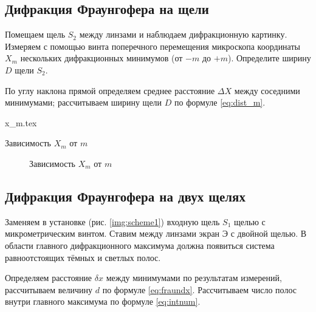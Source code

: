 \documentclass[a5paper,10pt, twoside]{article} %
\begin{document}
\subsection{Дифракция Фраунгофера на щели}

Помещаем щель $S_2$ между линзами и наблюдаем дифракционную картинку. Измеряем с помощью винта 
поперечного перемещения микроскопа координаты $X_m$ нескольких дифракционных минимумов 
(от $-m$ до $+m$). Определите ширину $D$ щели $S_2$.

По углу наклона прямой определяем среднее расстояние $\Delta X$ между соседними минимумами;
рассчитываем ширину щели $D$ по формуле \eqref{eq:dist_m}.

\begin{table}[h]
	\begin{center}
		{x_m.tex}
	\end{center}
	\caption{Зависимость $X_m$ от $m$}
\end{table}

\begin{figure}[h]
	\caption{Зависимость $X_m$ от $m$} 
\end{figure}

\subsection{Дифракция Фраунгофера на двух щелях}

Заменяем в установке (рис. \ref{img:scheme1}) входную щель $S_1$ щелью с микрометрическим винтом.
Ставим между линзами экран Э с двойной щелью. В области главного дифракционного максимума должна 
появиться система равноотстоящих тёмных и светлых полос.

Определяем расстояние $\delta x$ между минимумами по результатам измерений, рассчитываем величину 
$d$ по формуле \eqref{eq:fraundx}. Рассчитываем число полос внутри главного максимума по формуле 
\eqref{eq:intnum}.
\end{document}
